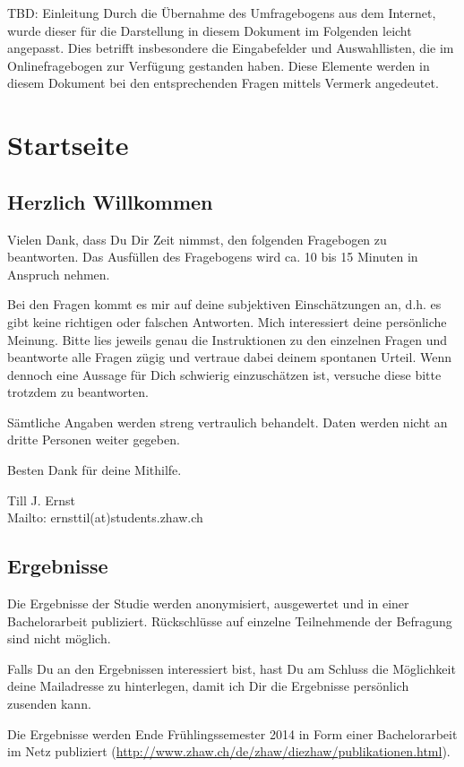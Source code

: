 \begin{RaggedRight}
TBD: Einleitung
Durch die Übernahme des Umfragebogens aus dem Internet, wurde dieser für die Darstellung in diesem Dokument im Folgenden leicht angepasst. Dies betrifft insbesondere die Eingabefelder und Auswahllisten, die im Onlinefragebogen zur Verfügung gestanden haben. Diese Elemente werden in diesem Dokument bei den entsprechenden Fragen mittels Vermerk angedeutet.
\section{Startseite}\label{anhangSesction.Startseite}
\subsection*{Herzlich Willkommen}
Vielen Dank, dass Du Dir Zeit nimmst, den folgenden Fragebogen zu beantworten. Das Ausfüllen des Fragebogens wird ca. 10 bis 15 Minuten in Anspruch nehmen.\par
Bei den Fragen kommt es mir auf deine subjektiven Einschätzungen an, d.h. es gibt keine richtigen oder falschen Antworten. Mich interessiert deine persönliche Meinung. Bitte lies jeweils genau die Instruktionen zu den einzelnen Fragen und beantworte alle Fragen zügig und vertraue dabei deinem spontanen Urteil. Wenn dennoch eine Aussage für Dich schwierig einzuschätzen ist, versuche diese bitte trotzdem zu beantworten. \par
Sämtliche Angaben werden streng vertraulich behandelt. Daten werden nicht an dritte Personen weiter gegeben. \par
Besten Dank für deine Mithilfe.\par
Till J. Ernst\\
Mailto: ernsttil(at)students.zhaw.ch
\subsection*{Ergebnisse}
Die Ergebnisse der Studie werden anonymisiert, ausgewertet und in einer Bachelorarbeit publiziert. Rückschlüsse auf einzelne Teilnehmende der Befragung sind nicht möglich.\par
Falls Du an den Ergebnissen interessiert bist, hast Du am Schluss die Möglichkeit deine Mailadresse zu hinterlegen, damit ich Dir die Ergebnisse persönlich zusenden kann. \par
Die Ergebnisse werden Ende Frühlingssemester 2014 in Form einer Bachelorarbeit im Netz publiziert (\url{http://www.zhaw.ch/de/zhaw/die­zhaw/publikationen.html}).

\end{RaggedRight}
